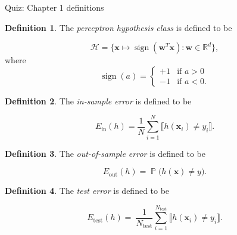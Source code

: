 \documentclass[10pt]{exam}
\theoremstyle{definition}
\newtheorem{defn}{Definition}
\newcommand{\R}{\mathbb R}
\DeclareMathOperator{\sign}{sign}
\DeclareMathOperator{\prob}{\mathbb P}
\newcommand{\Ein}{E_{\text{in}}}
\newcommand{\Eout}{E_{\text{out}}}
\newcommand{\Etest}{E_{\text{test}}}
\newcommand{\Ntest}{N_{\text{test}}}
\newcommand{\trans}[1]{{#1}^{T}}
\newcommand{\w}{\mathbf w}
\newcommand{\x}{\mathbf x}
\begin{document}
\begin{center}
{
\Huge
Quiz: Chapter 1 definitions
}
\end{center}

\begin{center}
\end{center}

\begin{defn}
    The \emph{perceptron hypothesis class} is defined to be
    \begin{solutionorbox}[1.7in]
        \begin{equation*}
        \mathcal H = \bigg\{ \x \mapsto \sign(\trans\w \x) : \w \in \R^d \bigg\},
        \end{equation*}
        where
        \begin{equation*}
        \sign(a) =
            \begin{cases}
                +1 & \text{if~} a>0 \\
                -1 & \text{if~} a<0
                .
        \end{cases}
        \end{equation*}
    \end{solutionorbox}
\end{defn}

\begin{defn}
    The \emph{in-sample error} is defined to be
    \begin{solutionorbox}[1.7in]
    \begin{equation*}
        \Ein(h) = \frac1N \sum_{i=1}^N \llbracket h(\x_i) \ne y_i \rrbracket
        .
    \end{equation*}
    \end{solutionorbox}
\end{defn}

\begin{defn}
    The \emph{out-of-sample error} is defined to be
    \begin{solutionorbox}[1.7in]
    \begin{equation*}
        \Eout(h) = \prob\big(h(\x) \ne y\big)
        .
    \end{equation*}
    \end{solutionorbox}
\end{defn}

\begin{defn}
    The \emph{test error} is defined to be
    \begin{solutionorbox}[1.7in]
    \begin{equation*}
    \Etest(h) 
    =
    \
    \frac1{\Ntest} \sum_{i=1}^{\Ntest} \llbracket h(\x_i) \ne y_i \rrbracket
        .
    \end{equation*}
    \end{solutionorbox}
\end{defn}
\end{document}
